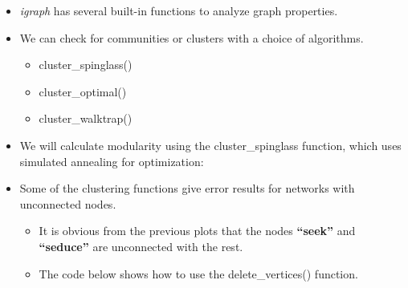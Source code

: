 \documentclass[
]{article}
\newenvironment{Shaded}{\begin{snugshade}}{\end{snugshade}}
\newcommand{\AttributeTok}[1]{\textcolor[rgb]{0.13,0.29,0.53}{#1}}
\newcommand{\CommentTok}[1]{\textcolor[rgb]{0.56,0.35,0.01}{\textit{#1}}}
\newcommand{\ConstantTok}[1]{\textcolor[rgb]{0.56,0.35,0.01}{#1}}
\newcommand{\DecValTok}[1]{\textcolor[rgb]{0.00,0.00,0.81}{#1}}
\newcommand{\FloatTok}[1]{\textcolor[rgb]{0.00,0.00,0.81}{#1}}
\newcommand{\FunctionTok}[1]{\textcolor[rgb]{0.13,0.29,0.53}{\textbf{#1}}}
\newcommand{\NormalTok}[1]{#1}
\newcommand{\OtherTok}[1]{\textcolor[rgb]{0.56,0.35,0.01}{#1}}
\newcommand{\SpecialCharTok}[1]{\textcolor[rgb]{0.81,0.36,0.00}{\textbf{#1}}}
\newcommand{\StringTok}[1]{\textcolor[rgb]{0.31,0.60,0.02}{#1}}
\providecommand{\tightlist}{%
  \setlength{\itemsep}{0pt}\setlength{\parskip}{0pt}}
\begin{document}
\begin{itemize}
\tightlist
\item
  \emph{igraph} has several built-in functions to analyze graph properties.
\item
  We can check for communities or clusters with a choice of algorithms.

  \begin{itemize}
  \tightlist
  \item
    cluster\_spinglass()
  \item
    cluster\_optimal()
  \item
    cluster\_walktrap()
  \end{itemize}
\item
  We will calculate modularity using the cluster\_spinglass function, which uses simulated annealing for optimization:
\item
  Some of the clustering functions give error results for networks with unconnected nodes.

  \begin{itemize}
  \tightlist
  \item
    It is obvious from the previous plots that the nodes \textbf{``seek''} and \textbf{``seduce''} are unconnected with the rest.
  \item
    The code below shows how to use the delete\_vertices() function.
  \end{itemize}
\end{itemize}

\begin{Shaded}
\end{Shaded}
\end{document}
